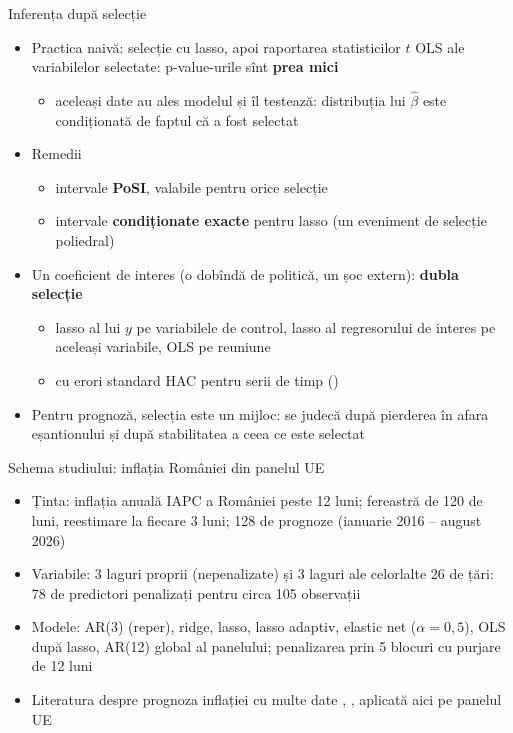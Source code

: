 \begin{frame}{Inferența după selecție}
\itemsize{\small}
\begin{itemize}
    \item Practica naivă: selecție cu lasso, apoi raportarea statisticilor $t$ OLS ale variabilelor selectate: p-value-urile sînt \textbf{prea mici}
    \begin{itemize}
        \item aceleași date au ales modelul și îl testează: distribuția lui $\hat\beta$ este condiționată de faptul că a fost selectat
    \end{itemize}
    \item Remedii
    \begin{itemize}
        \item intervale \textbf{PoSI}, valabile pentru orice selecție 
        \item intervale \textbf{condiționate exacte} pentru lasso (un eveniment de selecție poliedral) 
    \end{itemize}
    \item Un coeficient de interes (o dobîndă de politică, un șoc extern): \textbf{dubla selecție} 
    \begin{itemize}
        \item lasso al lui $y$ pe variabilele de control, lasso al regresorului de interes pe aceleași variabile, OLS pe reuniune
        \item cu erori standard HAC pentru serii de timp ()
    \end{itemize}
    \item Pentru prognoză, selecția este un mijloc: se judecă după pierderea în afara eșantionului și după stabilitatea a ceea ce este selectat
\end{itemize}
\end{frame}

\begin{frame}{Schema studiului: inflația României din panelul UE}
\itemsize{\small}
\begin{itemize}
    \item Ținta: inflația anuală IAPC a României peste 12 luni; fereastră de 120 de luni, reestimare la fiecare 3 luni; 128 de prognoze (ianuarie 2016 -- august 2026)
    \item Variabile: 3 laguri proprii (nepenalizate) și 3 laguri ale celorlalte 26 de țări: 78 de predictori penalizați pentru circa 105 observații
    \item Modele: AR(3) (reper), ridge, lasso, lasso adaptiv, elastic net ($\alpha = 0{,}5$), OLS după lasso, AR(12) global al panelului; penalizarea prin 5 blocuri cu purjare de 12 luni
    \item Literatura despre prognoza inflației cu multe date , , aplicată aici pe panelul UE
\end{itemize}
\end{frame}


